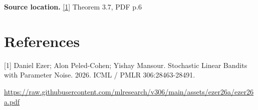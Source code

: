 \documentclass[10pt,a4paper]{article}
\begin{document}
\textbf{Source location.} \href{https://raw.githubusercontent.com/mlresearch/v306/main/assets/ezer26a/ezer26a.pdf}{[1]} Theorem 3.7, PDF p.6

\section{References}
[1] Daniel Ezer; Alon Peled-Cohen; Yishay Mansour. Stochastic Linear Bandits with Parameter Noise. 2026. ICML / PMLR 306:28463-28491.

\url{https://raw.githubusercontent.com/mlresearch/v306/main/assets/ezer26a/ezer26a.pdf}
\end{document}

